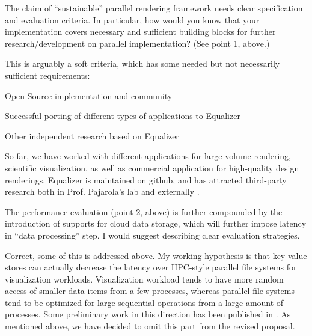 \begin{displayquote} The claim of “sustainable” parallel rendering framework
needs clear specification and evaluation criteria. In particular, how would you
know that your implementation covers necessary and sufficient building blocks
for further research/development on parallel implementation? (See point 1,
above.)
\end{displayquote}

This is arguably a soft criteria, which has some needed but not necessarily sufficient requirements:
\begin{compactitem}
\item Open Source implementation and community
\item Successful porting of different types of applications to Equalizer
\item Other independent research based on Equalizer
\end{compactitem}

So far, we have worked with different applications for large volume rendering,
scientific visualization, as well as commercial application for high-quality
design renderings. Equalizer is maintained on github, and has attracted
third-party research both in Prof. Pajarola's lab \cite{GMBP:10, EBAHMP:12,
MEP:10, GEMPG:13} and externally \cite{Omegalib, FNTTL:13}.

\begin{displayquote} The performance evaluation (point 2, above) is further
compounded by the introduction of supports for cloud data storage, which will
further impose latency in “data processing” step. I would suggest describing
clear evaluation strategies.
\end{displayquote}

Correct, some of this is addressed above. My working hypothesis is that
key-value stores can actually decrease the latency over HPC-style parallel file
systems for visualization workloads. Visualization workload tends to have more
random access of smaller data items from a few processes, whereas parallel file
systems tend to be optimized for large sequential operations from a large amount
of processes. Some preliminary work in this direction has been published in
\cite{Eilemann:15}. As mentioned above, we have decided to omit this part from
the revised proposal.


\begin{displayquote}
\end{displayquote}

\begin{displayquote}
\end{displayquote}


\clearpage




